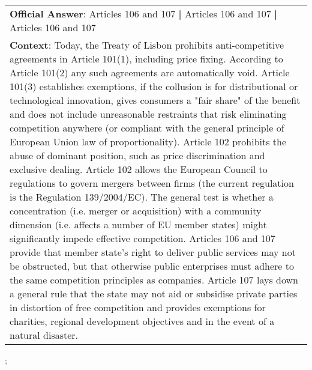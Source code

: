 \begin{figure*}[ht]
{\begin{tabular}{p{}}
            \textbf{Official Answer}: Articles 106 and 107 \textbf{|} Articles 106 and 107 \textbf{|} Articles 106 and 107                                                                                                                                                                                                                                                                                                                                                                                                                                                                                                                                                                                                                                                                                                                                                                                                                                                                                                                                                                                                                                                                                                                                                                                                                                                                                                                                                   \\
            \textbf{Context}: Today, the Treaty of Lisbon prohibits anti-competitive agreements in Article 101(1), including price fixing. According to Article 101(2) any such agreements are automatically void. Article 101(3) establishes exemptions, if the collusion is for distributional or technological innovation, gives consumers a "fair share" of the benefit and does not include unreasonable restraints that risk eliminating competition anywhere (or compliant with the general principle of European Union law of proportionality). Article 102 prohibits the abuse of dominant position, such as price discrimination and exclusive dealing. Article 102 allows the European Council to regulations to govern mergers between firms (the current regulation is the Regulation 139/2004/EC). The general test is whether a concentration (i.e. merger or acquisition) with a community dimension (i.e. affects a number of EU member states) might significantly impede effective competition. Articles 106 and 107 provide that member state's right to deliver public services may not be obstructed, but that otherwise public enterprises must adhere to the same competition principles as companies. Article 107 lays down a general rule that the state may not aid or subsidise private parties in distortion of free competition and provides exemptions for charities, regional development objectives and in the event of a natural disaster. \\
        \end{tabular}
    };
    \label{fig:ex-5726a7ecf1498d1400e8e656}
\end{figure*}

